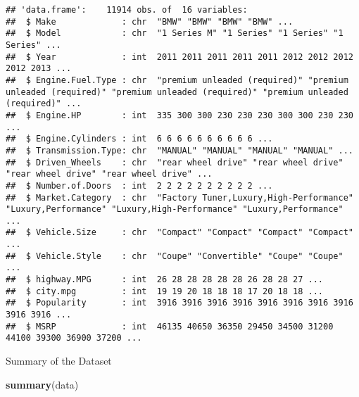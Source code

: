 \documentclass[
]{article}
\newenvironment{Shaded}{\begin{snugshade}}{\end{snugshade}}
\newcommand{\KeywordTok}[1]{\textcolor[rgb]{0.13,0.29,0.53}{\textbf{#1}}}
\newcommand{\NormalTok}[1]{#1}
\begin{document}
\begin{verbatim}
## 'data.frame':    11914 obs. of  16 variables:
##  $ Make             : chr  "BMW" "BMW" "BMW" "BMW" ...
##  $ Model            : chr  "1 Series M" "1 Series" "1 Series" "1 Series" ...
##  $ Year             : int  2011 2011 2011 2011 2011 2012 2012 2012 2012 2013 ...
##  $ Engine.Fuel.Type : chr  "premium unleaded (required)" "premium unleaded (required)" "premium unleaded (required)" "premium unleaded (required)" ...
##  $ Engine.HP        : int  335 300 300 230 230 230 300 300 230 230 ...
##  $ Engine.Cylinders : int  6 6 6 6 6 6 6 6 6 6 ...
##  $ Transmission.Type: chr  "MANUAL" "MANUAL" "MANUAL" "MANUAL" ...
##  $ Driven_Wheels    : chr  "rear wheel drive" "rear wheel drive" "rear wheel drive" "rear wheel drive" ...
##  $ Number.of.Doors  : int  2 2 2 2 2 2 2 2 2 2 ...
##  $ Market.Category  : chr  "Factory Tuner,Luxury,High-Performance" "Luxury,Performance" "Luxury,High-Performance" "Luxury,Performance" ...
##  $ Vehicle.Size     : chr  "Compact" "Compact" "Compact" "Compact" ...
##  $ Vehicle.Style    : chr  "Coupe" "Convertible" "Coupe" "Coupe" ...
##  $ highway.MPG      : int  26 28 28 28 28 28 26 28 28 27 ...
##  $ city.mpg         : int  19 19 20 18 18 18 17 20 18 18 ...
##  $ Popularity       : int  3916 3916 3916 3916 3916 3916 3916 3916 3916 3916 ...
##  $ MSRP             : int  46135 40650 36350 29450 34500 31200 44100 39300 36900 37200 ...
\end{verbatim}

Summary of the Dataset

\begin{Shaded}
\begin{Highlighting}[]
\KeywordTok{summary}\NormalTok{(data)}
\end{Highlighting}
\end{Shaded}
\end{document}
